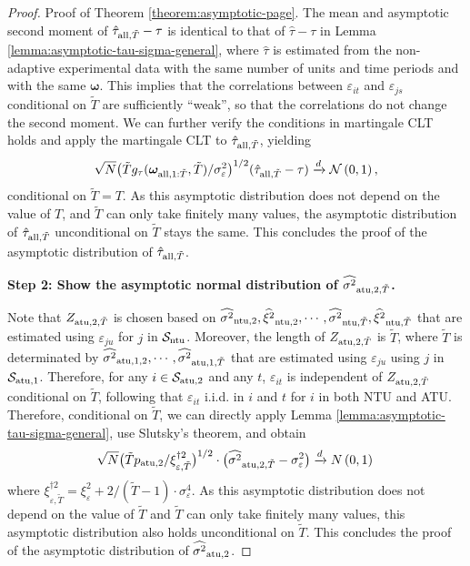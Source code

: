 \begin{proof}{Proof of Theorem \ref{theorem:asymptotic-page}.}
The mean and asymptotic second moment of $\hat{\tau}_{\mathrm{all},\tilde{T}} - \tau$ is identical to that of $ \hat{\tau} - \tau$ in Lemma \ref{lemma:asymptotic-tau-sigma-general}, where $\hat{\tau}$ is estimated from the non-adaptive experimental data with the same number of units and time periods and with the same $\bm{\omega}$. This implies that the correlations between $\varepsilon_{it}$ and $\varepsilon_{js}$ conditional on $\tilde{T}$ are sufficiently ``weak'', so that the correlations do not change the second moment. We can further verify the conditions in martingale CLT holds and apply the martingale CLT to $\hat{\tau}_{\mathrm{all},\tilde{T}}$, yielding
\[\sqrt{N} \big(\tilde{T}g_\tau(\bm{\omega}_{\mathrm{all},1:\tilde{T}},\tilde{T})/\sigma_\varepsilon^2\big)^{1/2} (\hat{\tau}_{\mathrm{all},\tilde{T}} - \tau) \xrightarrow{d} \mathcal{N} \left(0,1 \right), \]
conditional on $\tilde{T} = T$. As this asymptotic distribution does not depend on the value of $T$, and 
$\tilde{T}$ can only take finitely many values, the asymptotic distribution of $\hat{\tau}_{\mathrm{all},\tilde{T}}$ unconditional on $\tilde{T}$ stays the same. 
This concludes the proof of the asymptotic distribution of $\hat{\tau}_{\mathrm{all},\tilde{T}}$. 

\textbf{Step 2: Show the asymptotic normal distribution of $\widehat{\sigma^2}_{\mathrm{atu},2,\tilde{T}}$.}

Note that $Z_{\mathrm{atu},2,\tilde{T}}$ is chosen based on $\widehat{\sigma^2}_{\mathrm{ntu},2}, \widehat{\xi^2}_{\mathrm{ntu},2}, \cdots, \widehat{\sigma^2}_{\mathrm{ntu},\tilde{T}}, \widehat{\xi^2}_{\mathrm{ntu},\tilde{T}}$ that are estimated using $\varepsilon_{ju}$ for $j$ in $\mathcal{S}_{\mathrm{ntu}}$. Moreover, the length of $Z_{\mathrm{atu},2,\tilde{T}}$ is $\tilde{T}$, where $\tilde{T}$ is determinated by $\widehat{\sigma^2}_{\mathrm{atu},1,2}, \cdots, \widehat{\sigma^2}_{\mathrm{atu},1,\tilde{T}}$ that are estimated using $\varepsilon_{ju}$ using $j$ in $\mathcal{S}_{\mathrm{atu},1}$.  Therefore, for any $i \in \mathcal{S}_{\mathrm{atu},2}$ and any $t$, $\varepsilon_{it}$ is independent of $Z_{\mathrm{atu},2,\tilde{T}}$ conditional on $\tilde{T}$, following that $\varepsilon_{it}$ i.i.d. in $i$ and $t$ for $i$ in both NTU and ATU. Therefore, conditional on $\tilde{T}$, we can directly apply Lemma \ref{lemma:asymptotic-tau-sigma-general}, use Slutsky's theorem, and obtain 
\[\sqrt{N}  \big(\tilde{T} p_{\mathrm{atu},2}/\xi^{\dagger 2}_{\varepsilon,\tilde{T}} \big)^{1/2} \cdot \big(\widehat{\sigma^2}_{\mathrm{atu},2,\tilde{T}} - \sigma_\varepsilon^2 \big) \xrightarrow{d} N\left(0, 1  \right) \, \]
where 
$\xi^{\dagger 2}_{\varepsilon,\tilde{T}}  = \xi_\varepsilon^2 + 2/(\tilde{T}-1) \cdot \sigma_\varepsilon^4 $. As this asymptotic distribution does not depend on the value of $\tilde{T}$ and $\tilde{T}$ can only take finitely many values, this asymptotic distribution also holds unconditional on $\tilde{T}$. 
This concludes the proof of the asymptotic distribution of $\widehat{\sigma^2}_{\mathrm{atu},2}$.


\end{proof}
